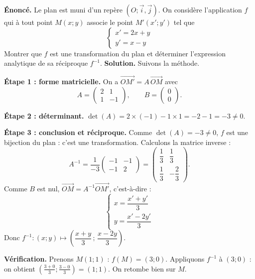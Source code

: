 \documentclass[11pt]{article}
\newcommand{\cle}[1]{{\popxbold\color{popdark}#1}}
\begin{document}
\begin{exoresolu}
\textbf{Énoncé.} Le plan est muni d'un repère $(O ; \vec{i}, \vec{j})$. On considère l'application $f$ qui à tout point $M(x ; y)$ associe le point $M'(x' ; y')$ tel que
\[ \begin{cases} x' = 2x + y \\ y' = x - y \end{cases} \]
Montrer que $f$ est une transformation du plan et déterminer l'expression analytique de sa réciproque $f^{-1}$.
\tcblower
\textbf{Solution.} Suivons la méthode.

\textbf{Étape 1 : forme matricielle.} On a $\overrightarrow{OM'} = A\,\overrightarrow{OM}$ avec
\[ A = \begin{pmatrix} 2 & 1 \\ 1 & -1 \end{pmatrix}, \qquad B = \begin{pmatrix} 0 \\ 0 \end{pmatrix}. \]

\textbf{Étape 2 : déterminant.} $\det(A) = 2 \times (-1) - 1 \times 1 = -2 - 1 = -3 \neq 0$.

\textbf{Étape 3 : conclusion et réciproque.} Comme $\det(A) = -3 \neq 0$, $f$ est une bijection du plan : c'est une \cle{transformation}. Calculons la matrice inverse :
\[ A^{-1} = \frac{1}{-3}\begin{pmatrix} -1 & -1 \\ -1 & 2 \end{pmatrix} = \begin{pmatrix} \dfrac{1}{3} & \dfrac{1}{3} \\[4pt] \dfrac{1}{3} & -\dfrac{2}{3} \end{pmatrix}. \]
Comme $B$ est nul, $\overrightarrow{OM} = A^{-1}\overrightarrow{OM'}$, c'est-à-dire :
\[ \begin{cases} x = \dfrac{x' + y'}{3} \\[4pt] y = \dfrac{x' - 2y'}{3} \end{cases} \]
Donc $f^{-1} : (x ; y) \mapsto \left(\dfrac{x + y}{3} \,;\, \dfrac{x - 2y}{3}\right)$.

\textbf{Vérification.} Prenons $M(1 ; 1)$ : $f(M) = (3 ; 0)$. Appliquons $f^{-1}$ à $(3 ; 0)$ : on obtient $\left(\frac{3 + 0}{3} ; \frac{3 - 0}{3}\right) = (1 ; 1)$. On retombe bien sur $M$.
\end{exoresolu}
\end{document}
